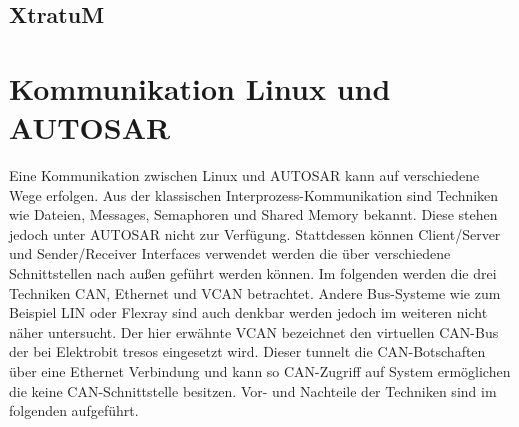 \documentclass[
  a4paper,					    %
  twoside,
  DIV=calc,     				%
  bibliography=totoc,
  cleardoublepage=empty,
  ngerman,     					%
  final       					%
]{scrbook}
\begin{document}

\subsection{XtratuM}
\label{sec:xtratum}


\section{Kommunikation Linux und AUTOSAR}
\label{sec:Kommunikation_L_A}

Eine Kommunikation zwischen Linux und AUTOSAR kann auf verschiedene Wege erfolgen. Aus der klassischen Interprozess-Kommunikation sind Techniken wie Dateien, Messages, Semaphoren und Shared Memory bekannt. Diese stehen jedoch unter AUTOSAR nicht zur Verfügung. Stattdessen können Client/Server und Sender/Receiver Interfaces verwendet werden die über verschiedene Schnittstellen nach außen geführt werden können. Im folgenden werden die drei Techniken CAN, Ethernet und VCAN betrachtet. Andere Bus-Systeme wie zum Beispiel LIN oder Flexray sind auch denkbar werden jedoch im weiteren nicht näher untersucht. Der hier erwähnte VCAN bezeichnet den virtuellen CAN-Bus der bei Elektrobit tresos eingesetzt wird. Dieser tunnelt die CAN-Botschaften über eine Ethernet Verbindung und kann so CAN-Zugriff auf System ermöglichen die keine CAN-Schnittstelle besitzen. Vor- und Nachteile der Techniken sind im folgenden aufgeführt.
\end{document}
